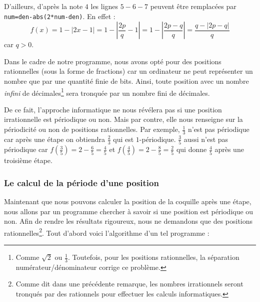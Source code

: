 \documentclass[a4paper,french,12pt]{article}
\begin{document}
D'ailleurs, d'après la note \hyperlink{note4}{$4$} les lignes $5-6-7$ peuvent être remplacées par \texttt{num=den-abs(2*num-den)}. En effet :\hypertarget{3}{}
\[f\left(x\right)=1-\left\lvert2x-1\right\rvert=1-\left\lvert\frac{2p}{q}-1\right\rvert=1-\left\lvert\frac{2p-q}{q}\right\rvert=\frac{q-\left\lvert2p-q\right\rvert}{q}\]
car $q>0$.

Dans le cadre de notre programme, nous avons opté pour des positions rationnelles (sous la forme de fractions) car un ordinateur ne peut représenter un nombre que par une quantité finie de bits. Ainsi, toute position avec un nombre \emph{infini} de décimales\footnote{Comme $\sqrt{2}$ ou $\frac{1}{3}$. Toutefois, pour les positions rationnelles, la séparation numérateur/dénominateur corrige ce problème.} sera tronquée par un nombre fini de décimales. 

De ce fait, l'approche informatique ne nous révélera pas si une position irrationnelle est périodique ou non. Mais par contre, elle nous renseigne sur la périodicité ou non de positions rationnelles. Par exemple, $\frac{1}{3}$ n'est pas périodique car après une étape on obtiendra $\frac{2}{3}$ qui est $1$-périodique. $\frac{3}{5}$ aussi n'est pas périodique car $f\left(\frac{3}{5}\right)=2-\frac{6}{5}=\frac{4}{5}$ et $f\left(\frac{4}{5}\right)=2-\frac{8}{5}=\frac{2}{5}$ qui donne $\frac{4}{5}$ après une troisième étape.


\subsubsection{Le calcul de la période d'une position}
Maintenant que nous pouvons calculer la position de la coquille après une étape, nous allons par un programme chercher à savoir si une position est périodique ou non. Afin de rendre les résultats rigoureux, nous ne demandons que des positions rationnelles\footnote{Comme dit dans une précédente remarque, les nombres irrationnels seront tronqués par des rationnels pour effectuer les calculs informatiques.}. Tout d'abord voici l'algorithme d'un tel programme :
\end{document}
